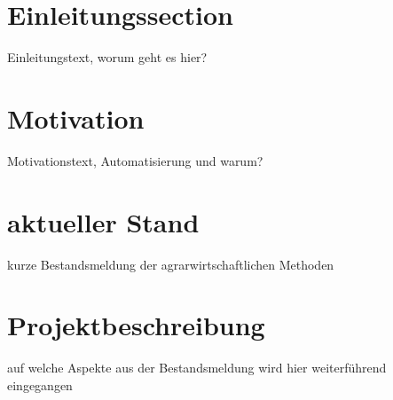 
\section{Einleitungssection}
Einleitungstext, worum geht es hier?

\section{Motivation}
Motivationstext, Automatisierung und warum?

\section{aktueller Stand}
kurze Bestandsmeldung der agrarwirtschaftlichen Methoden

\section{Projektbeschreibung}
auf welche Aspekte aus der Bestandsmeldung wird hier weiterführend eingegangen
